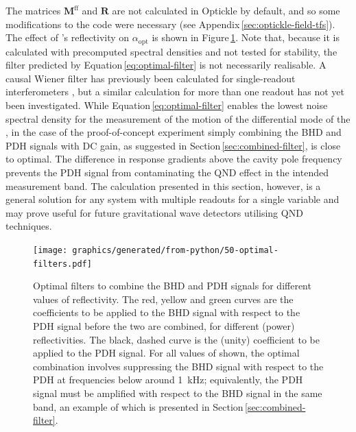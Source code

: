 The matrices $\mathbf{M}^{\textrm{ff}}$ and $\mathbf{R}$ are not calculated in Optickle by default, and so some modifications to the code were necessary (see Appendix\,\ref{sec:optickle-field-tfs}). The effect of \MINT{}'s reflectivity on $\alpha_{\textrm{opt}}$ is shown in Figure\,\ref{fig:optimal-filters}. Note that, because it is calculated with precomputed spectral densities and not tested for stability, the filter predicted by Equation\,\ref{eq:optimal-filter} is not necessarily realisable. A causal Wiener filter has previously been calculated for single-readout interferometers \cite{MuellerEbhardt2009, Miao2010}, but a similar calculation for more than one readout has not yet been investigated. While Equation\,\ref{eq:optimal-filter} enables the lowest noise spectral density for the measurement of the motion of the differential mode of the \SSM{}, in the case of the proof-of-concept experiment simply combining the \gls{BHD} and \gls{PDH} signals with \gls{DC} gain, as suggested in Section\,\ref{sec:combined-filter}, is close to optimal. The difference in response gradients above the cavity pole frequency prevents the \gls{PDH} signal from contaminating the \gls{QND} effect in the intended measurement band. The calculation presented in this section, however, is a general solution for any system with multiple readouts for a single variable and may prove useful for future gravitational wave detectors utilising \gls{QND} techniques.
\begin{figure}
  \texttt{[image: graphics/generated/from-python/50-optimal-filters.pdf]}
  \caption[Optimal filters to combine the balanced homodyne and Pound-Drever-Hall signals for different values of \MINT{} reflectivity]{\label{fig:optimal-filters}Optimal filters to combine the BHD and PDH signals for different values of \MINT{} reflectivity. The red, yellow and green curves are the coefficients to be applied to the BHD signal with respect to the PDH signal before the two are combined, for different \MINT{} (power) reflectivities. The black, dashed curve is the (unity) coefficient to be applied to the PDH signal. For all values of \MINT{} shown, the optimal combination involves suppressing the BHD signal with respect to the PDH at frequencies below around \SI{1}{\kilo\hertz}; equivalently, the PDH signal must be amplified with respect to the BHD signal in the same band, an example of which is presented in Section\,\ref{sec:combined-filter}.}
\end{figure}

